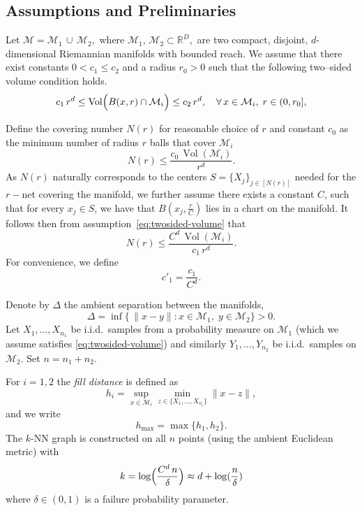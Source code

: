 \documentclass{article}
\theoremstyle{plain}
\theoremstyle{definition}
\theoremstyle{remark}
\begin{document}
\subsection{Assumptions and Preliminaries}
\label{app:assumptions-for-threshold}

Let \(\mathcal{M} = \mathcal{M}_1 \, \cup \, \mathcal{M}_2,\) where
\(
\mathcal{M}_1,\, \mathcal{M}_2 \subset \mathbb{R}^D,
\)
are two compact, disjoint, \(d\)-dimensional Riemannian manifolds with bounded reach. We assume that there exist constants \(0<c_1\le c_2\) and a radius \(r_0>0\) such that the following two--sided volume condition holds.
\begin{equation}\label{eq:twosided-volume}
c_1\,r^d \le \operatorname{Vol}\Bigl(B(x,r)\cap \mathcal{M}_i\Bigr) \le c_2\,r^d,\quad \forall\, x\in \mathcal{M}_i,\; r\in (0,r_0],
\end{equation}


Define the covering number $N(r)$ for reasonable choice of $r$ and constant $c_0$ as the minimum number of radius $r$ balls that cover $\mathcal{M}_i$
$$
N(r) \le \frac{c_0\,\operatorname{Vol}(\mathcal{M}_i)}{r^d}.
$$
As $N(r)$ naturally corresponds to the centers $S = \{X_j\}_{j \in [N(r)]}$ needed for the $r-$net covering the manifold, we further assume there exists a constant $C$, such that for every $x_j \in S$, we have that $B(x_j, \frac{r}{C})$ lies in a chart on the manifold. It follows then from assumption~\ref{eq:twosided-volume} that
\[
N(r) \le \frac{C^d\,\operatorname{Vol}(\mathcal{M}_i)}{c_1\,r^d}.
\] For convenience, we define
\[
c'_1 = \frac{c_1}{C^d}.
\]


Denote by \(\Delta\) the ambient separation between the manifolds,
\[
\Delta = \inf\{\,\|x-y\| : x\in \mathcal{M}_1,\; y\in \mathcal{M}_2\} > 0.
\]
Let \(X_1,\dots,X_{n_1}\) be i.i.d.\ samples from a probability measure on \(\mathcal{M}_1\) (which we assume satisfies \eqref{eq:twosided-volume}) and similarly \(Y_1,\dots,Y_{n_2}\) be i.i.d.\ samples on \(\mathcal{M}_2\). Set \(n=n_1+n_2\).

For \(i=1,2\) the \emph{fill distance} is defined as
\[
h_i = \sup_{x\in \mathcal{M}_i} \min_{z\in\{X_1,\dots,X_{n_i}\}} \|x-z\|,
\]
and we write
\[
h_{\max} = \max\{h_1,h_2\}.
\]
The \(k\)-NN graph is constructed on all \(n\) points (using the ambient Euclidean metric) with 
\begin{equation}\label{eq:k-choice}
k = \log\Bigl(\frac{C^d\,n}{\delta}\Bigr) \approx d + \log(\frac{n}{\delta})
\end{equation}
where \(\delta\in (0,1)\) is a failure probability parameter.
\end{document}
